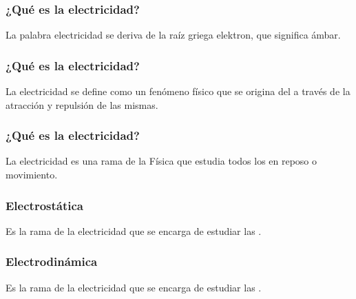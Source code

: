 \documentclass[14pt]{beamer}
\begin{document}
\begin{frame}
\frametitle{¿Qué es la electricidad?}
La palabra electricidad se deriva de la raíz griega elektron, que significa ámbar.
\end{frame}
\begin{frame}
\frametitle{¿Qué es la electricidad?}
La electricidad se define como un fenómeno físico que se origina del  a través de la atracción y repulsión de las mismas.
\end{frame}
\begin{frame}
\frametitle{¿Qué es la electricidad?}
La electricidad es una rama de la Física que estudia todos los  en reposo o movimiento.
\end{frame}
\begin{frame}
\frametitle{Electrostática}
Es la rama de la electricidad que se encarga de estudiar las .
\end{frame}
\begin{frame}
\frametitle{Electrodinámica}
Es la rama de la electricidad que se encarga de estudiar las .
\end{frame}
\end{document}

